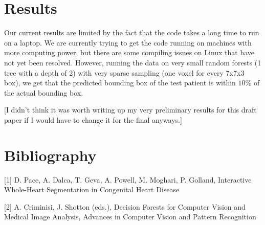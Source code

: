 \section{Results}
Our current results are limited by the fact that the code takes a long time to run on a laptop. We are currently trying to get the code running on machines with more computing power, but there are some compiling issues on Linux that have not yet been resolved. However, running the data on very small random forests (1 tree with a depth of 2) with very sparse sampling (one voxel for every 7x7x3 box), we get that the predicted bounding box of the test patient is within $10\%$ of the actual bounding box.

[I didn't think it was worth writing up my very preliminary results for this draft paper if I would have to change it for the final anyways.]


\section{Bibliography}
[1] D. Pace, A. Dalca, T. Geva, A. Powell, M. Moghari, P. Golland, Interactive Whole-Heart Segmentation in Congenital Heart Disease

[2] A. Criminisi, J. Shotton (eds.), Decision Forests for Computer Vision and Medical Image Analysis, Advances in Computer Vision and Pattern Recognition

